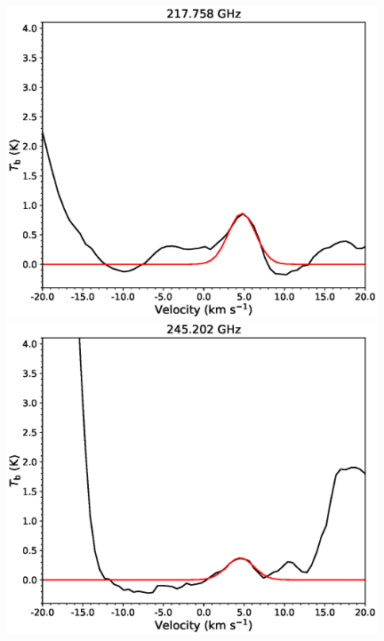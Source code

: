 \begin{figure}[H] 
\begin{center}
\begin{minipage}{0.98\textwidth} 
\begin{center}
\begin{minipage}{0.48\textwidth}
\begin{center}
\includegraphics[width=0.98\textwidth]{OrionKL/spectrum/HC/217.758328w_fit.eps}
\end{center}
\end{minipage}
\begin{minipage}{0.48\textwidth}
\begin{center}
\includegraphics[width=0.98\textwidth]{OrionKL/spectrum/HC/245.2021362w_fit.eps}
\end{center}
\end{minipage}
\end{center}
\end{minipage}


\end{center}
\end{figure}
